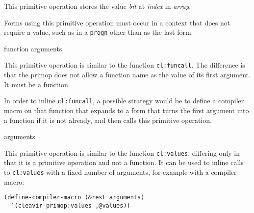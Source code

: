 This primitive operation stores the value \textit{bit} at
\textit{index} in \textit{array}.

Forms using this primitive operation must occur in a context that does
not require a value, such as in a \texttt{progn} other than as the
last form.

 {function \rest arguments}

This primitive operation is similar to the function \texttt{cl:funcall}.
The difference is that the primop does not allow a function name as
the value of its first argument. It must be a function.

In order to inline \texttt{cl:funcall}, a possible strategy would
be to define a compiler macro on that function that expands to a
form that turns the first argument into a function if it is not
already, and then calls this primitive operation.

 {\rest arguments}

This primitive operation is similar to the function \texttt{cl:values},
differing only in that it is a primitive operation and not a function.
It can be used to inline calls to \texttt{cl:values} with a fixed
number of arguments, for example with a compiler macro:

\begin{verbatim}
(define-compiler-macro (&rest arguments)
  `(cleavir-primop:values ,@values))
\end{verbatim}
